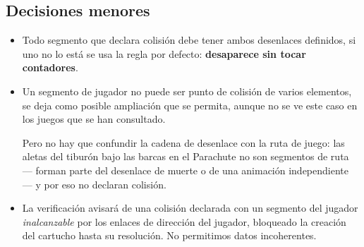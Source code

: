 \subsection{Decisiones menores}

\begin{itemize}
	\item Todo segmento que declara colisión debe tener
	ambos desenlaces definidos, si uno no lo está se usa la
	regla por defecto: \textbf{desaparece sin tocar contadores}.
	
	\item Un segmento de jugador no puede ser punto de
	colisión de varios elementos, se deja como posible
	ampliación que se permita, aunque no se ve este caso en los
	juegos que se han consultado.
	
	Pero no hay que confundir la cadena de desenlace con la ruta de juego: las aletas del tiburón bajo las barcas en el Parachute no son segmentos de ruta — forman parte del desenlace de muerte o de una animación independiente — y por eso no declaran colisión.
	
	
	\item La verificación avisará de una colisión declarada
	con un segmento del jugador \emph{inalcanzable} por los enlaces
	de dirección del jugador, bloqueado la creación del cartucho hasta
	su resolución. No permitimos datos incoherentes.
\end{itemize}

\clearpage